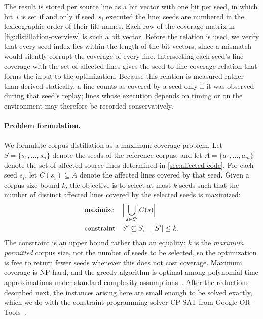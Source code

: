 The result is stored per source line as a bit vector with one bit per seed, in which bit~$i$ is set if and only if seed~$s_i$ executed the line; seeds are numbered in the lexicographic order of their file names.
Each row of the coverage matrix in \cref{fig:distillation-overview} is such a bit vector.
Before the relation is used, we verify that every seed index lies within the length of the bit vectors, since a mismatch would silently corrupt the coverage of every line.
Intersecting each seed's line coverage with the set of affected lines gives the seed-to-line coverage relation that forms the input to the optimization.
Because this relation is measured rather than derived statically, a line counts as covered by a seed only if it was observed during that seed's replay; lines whose execution depends on timing or on the environment may therefore be recorded conservatively.


\paragraph{Problem formulation.}
We formulate corpus distillation as a maximum coverage problem.
Let $S=\{s_1,\ldots,s_n\}$ denote the seeds of the reference corpus, and let $A=\{a_1,\ldots,a_m\}$ denote the set of affected source lines determined in \cref{sec:affected-code}.
For each seed $s_i$, let $C(s_i)\subseteq A$ denote the affected lines covered by that seed.
Given a corpus-size bound $k$, the objective is to select at most $k$ seeds such that the number of distinct affected lines covered by the selected seeds is maximized:
\begin{equation}
  \label{eq:max-coverage}
  \begin{alignedat}{2}
    &\text{maximize}   &\quad& \Bigl|\,\bigcup_{s\in S'} C(s)\Bigr| \\
    &\text{constraint} &     & S'\subseteq S,\quad |S'|\leq k.
  \end{alignedat}
\end{equation}
The constraint is an upper bound rather than an equality: $k$ is the \emph{maximum permitted} corpus size, not the number of seeds to be selected, so the optimization is free to return fewer seeds whenever this does not cost coverage.
Maximum coverage is NP-hard, and the greedy algorithm is optimal among polynomial-time approximations under standard complexity assumptions~\cite{feigeThresholdLnApproximating1998}.
After the reductions described next, the instances arising here are small enough to be solved exactly, which we do with the constraint-programming solver CP-SAT from Google OR-Tools~\cite{cpsatlp}.

